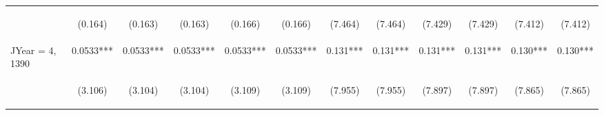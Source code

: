 \documentclass[]{article}
\begin{document}
\begin{center}
\begin{tabular}{lccccccccccc}
\vspace{4pt} & \begin{footnotesize}(0.164)\end{footnotesize} & \begin{footnotesize}(0.163)\end{footnotesize} & \begin{footnotesize}(0.163)\end{footnotesize} & \begin{footnotesize}(0.166)\end{footnotesize} & \begin{footnotesize}(0.166)\end{footnotesize} & \begin{footnotesize}(7.464)\end{footnotesize} & \begin{footnotesize}(7.464)\end{footnotesize} & \begin{footnotesize}(7.429)\end{footnotesize} & \begin{footnotesize}(7.429)\end{footnotesize} & \begin{footnotesize}(7.412)\end{footnotesize} & \begin{footnotesize}(7.412)\end{footnotesize} \\
JYear = 4, 1390 & 0.0533*** & 0.0533*** & 0.0533*** & 0.0533*** & 0.0533*** & 0.131*** & 0.131*** & 0.131*** & 0.131*** & 0.130*** & 0.130*** \\
\vspace{4pt} & \begin{footnotesize}(3.106)\end{footnotesize} & \begin{footnotesize}(3.104)\end{footnotesize} & \begin{footnotesize}(3.104)\end{footnotesize} & \begin{footnotesize}(3.109)\end{footnotesize} & \begin{footnotesize}(3.109)\end{footnotesize} & \begin{footnotesize}(7.955)\end{footnotesize} & \begin{footnotesize}(7.955)\end{footnotesize} & \begin{footnotesize}(7.897)\end{footnotesize} & \begin{footnotesize}(7.897)\end{footnotesize} & \begin{footnotesize}(7.865)\end{footnotesize} & \begin{footnotesize}(7.865)\end{footnotesize} \\

\end{tabular}
\end{center}
\end{document}
